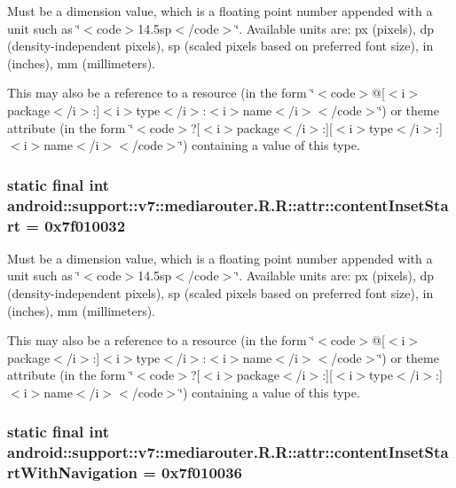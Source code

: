 Must be a dimension value, which is a floating point number appended with a unit such as \char`\"{}$<$code$>$14.5sp$<$/code$>$\char`\"{}. Available units are: px (pixels), dp (density-independent pixels), sp (scaled pixels based on preferred font size), in (inches), mm (millimeters). 

This may also be a reference to a resource (in the form \char`\"{}$<$code$>$@\mbox{[}$<$i$>$package$<$/i$>$:\mbox{]}$<$i$>$type$<$/i$>$:$<$i$>$name$<$/i$>$$<$/code$>$\char`\"{}) or theme attribute (in the form \char`\"{}$<$code$>$?\mbox{[}$<$i$>$package$<$/i$>$:\mbox{]}\mbox{[}$<$i$>$type$<$/i$>$:\mbox{]}$<$i$>$name$<$/i$>$$<$/code$>$\char`\"{}) containing a value of this type. \hypertarget{classandroid_1_1support_1_1v7_1_1mediarouter_1_1_r_1_1attr_fba41e0d22296c6268875fa4a6af5974}{
\subsubsection[{contentInsetStart}]{\setlength{\rightskip}{0pt plus 5cm}static final int android::support::v7::mediarouter.R.R::attr::contentInsetStart = 0x7f010032}}
\label{classandroid_1_1support_1_1v7_1_1mediarouter_1_1_r_1_1attr_fba41e0d22296c6268875fa4a6af5974}


Must be a dimension value, which is a floating point number appended with a unit such as \char`\"{}$<$code$>$14.5sp$<$/code$>$\char`\"{}. Available units are: px (pixels), dp (density-independent pixels), sp (scaled pixels based on preferred font size), in (inches), mm (millimeters). 

This may also be a reference to a resource (in the form \char`\"{}$<$code$>$@\mbox{[}$<$i$>$package$<$/i$>$:\mbox{]}$<$i$>$type$<$/i$>$:$<$i$>$name$<$/i$>$$<$/code$>$\char`\"{}) or theme attribute (in the form \char`\"{}$<$code$>$?\mbox{[}$<$i$>$package$<$/i$>$:\mbox{]}\mbox{[}$<$i$>$type$<$/i$>$:\mbox{]}$<$i$>$name$<$/i$>$$<$/code$>$\char`\"{}) containing a value of this type. \hypertarget{classandroid_1_1support_1_1v7_1_1mediarouter_1_1_r_1_1attr_cec2f29fcfbfd10d16cec0e8162713d5}{
\subsubsection[{contentInsetStartWithNavigation}]{\setlength{\rightskip}{0pt plus 5cm}static final int android::support::v7::mediarouter.R.R::attr::contentInsetStartWithNavigation = 0x7f010036}}
\label{classandroid_1_1support_1_1v7_1_1mediarouter_1_1_r_1_1attr_cec2f29fcfbfd10d16cec0e8162713d5}


